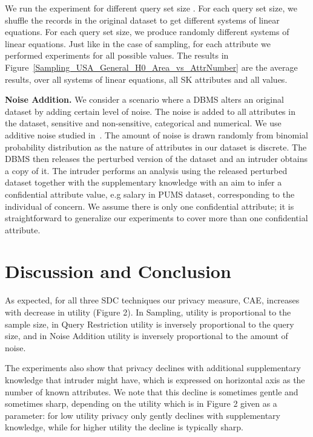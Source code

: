 \documentclass{llncs}
\begin{document}
We run the experiment for  different query set size
. For each query set size, we shuffle the records
in the original dataset to get different systems of linear
equations. For each query set size, we produce randomly 
different systems of linear equations. Just like in the case of
sampling, for each attribute we performed experiments for all
possible values. The results in Figure~\ref{Sampling_USA_General_H0_Area_vs_AttrNumber} are
the average results, over all  systems of linear equations,
all SK attributes and all values.



 \textbf{Noise Addition.} We consider a scenario where a DBMS alters an original dataset by adding certain level of noise.
 The noise is added to all attributes in the dataset, sensitive and  non-sensitive, categorical and numerical.
 We use additive noise studied in~\cite{Kim:Method86,Tendick:Optimal91,Fuller:Masking93,KimWinkler:Masking95,Yancey:disclos02}.
 The amount of noise is drawn randomly from binomial probability distribution as the nature of attributes in our dataset is discrete.
 The DBMS then releases the perturbed version of the dataset and an intruder obtains a copy of it.  The intruder
 performs an analysis using the released perturbed dataset together with the supplementary knowledge with an aim to infer a confidential
 attribute value, e.g salary in PUMS dataset, corresponding to the individual of concern. We assume there is only one confidential attribute;
 it is straightforward to generalize our experiments to cover more than one confidential attribute.







\section{Discussion and Conclusion}

As expected, for all three SDC techniques our privacy measure, CAE, increases with decrease in utility (Figure 2). In Sampling, utility
is proportional to the sample size, in Query Restriction  utility is inversely proportional to the query size, and in Noise Addition utility is inversely proportional to the amount of noise.

The experiments also show that privacy  declines with additional supplementary knowledge that intruder might have, which is expressed on horizontal axis as the number of known attributes. We note that this decline is sometimes gentle and sometimes sharp, depending on the utility which is in  Figure 2 given as a parameter: for low utility privacy only gently declines with supplementary knowledge, while for higher utility the decline is typically sharp.
\end{document}
